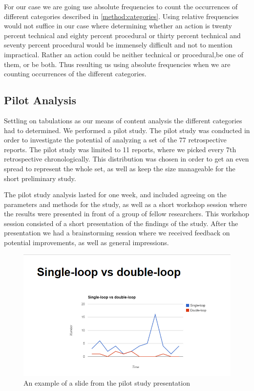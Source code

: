 For our case we are going use absolute frequencies to count the occurrences of different categories described in \autoref{method:categories}. Using relative frequencies would not suffice in our case where determining whether an action is twenty percent technical and eighty percent procedural or thirty percent technical and seventy percent procedural would be immensely difficult and not to mention impractical. Rather an action could be neither technical or procedural,be one of them, or be both. Thus resulting us using absolute frequencies when we are counting occurrences of the different categories.

\subsection{Pilot Analysis}
Settling on tabulations as our means of content analysis the different categories had to determined. We performed a pilot study.
The pilot study was conducted in order to investigate the potential of analyzing a set of the 77 retrospective reports.  The pilot study was limited to 11 reports, where we picked every 7th retrospective chronologically. This distribution was chosen in order to get an even spread to represent the whole set, as well as keep the size manageable for the short preliminary study.

The pilot study analysis lasted for one week, and included agreeing on the parameters and methods for the study, as well as a short workshop session where the results were presented in front of a group of fellow researchers. This workshop session consisted of a short presentation of the findings of the study. After the presentation we had a brainstorming session where we received feedback on potential improvements, as well as general impressions. 

\begin{figure}[!h]
	\centering
	\includegraphics[width=\textwidth]{figures/Pilot_loop.PNG}
	\caption{An example of a slide from the pilot study presentation }
	\label{figure:Pilot Slide}
\end{figure}

